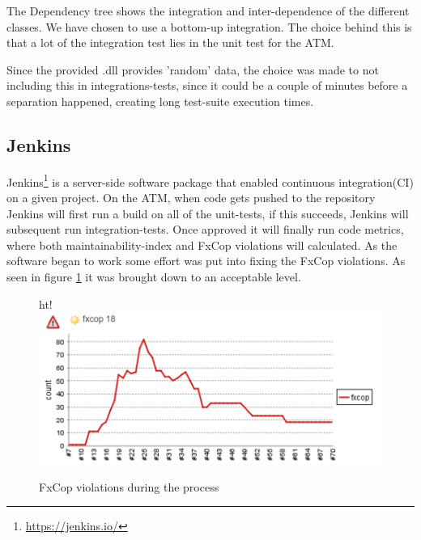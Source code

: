 	\pagebreak
	
	The Dependency tree shows the integration and inter-dependence of the different classes. We have chosen to use a bottom-up integration. The choice behind this is that a lot of the integration test lies in the unit test for the ATM. 
	
	Since the provided .dll provides 'random' data, the choice was made to not including this in integrations-tests, since it could be a couple of minutes before a separation happened, creating long test-suite execution times. 
	
	\subsection{Jenkins}
	Jenkins\footnote{\url{https://jenkins.io/}} is a server-side software package that enabled continuous integration(CI) on a given project. On the ATM, when code gets pushed to the repository Jenkins will first run a build on all of the unit-tests, if this succeeds, Jenkins will subsequent run integration-tests. Once approved it will finally run code metrics, where both maintainability-index and FxCop violations will calculated. 
	As the software began to work some effort was put into fixing the FxCop violations. As seen in figure \ref{fig:FxCop} it was brought down to an acceptable level.
	\begin{figure}{ht!}
		\centering
		\includegraphics[width=0.8\linewidth]{"Images/FxCop"}
		\caption{FxCop violations during the process}
		\label{fig:FxCop}
	\end{figure}
	\clearpage